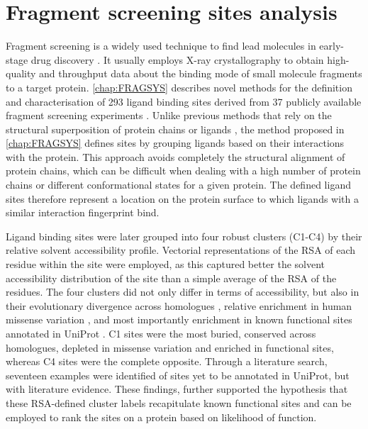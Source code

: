 \section{Fragment screening sites analysis}

Fragment screening is a widely used technique to find lead molecules in early-stage drug discovery \cite{MURRAY_2009_FBDD}. It usually employs X-ray crystallography to obtain high-quality and throughput data about the binding mode of small molecule fragments to a target protein. \autoref{chap:FRAGSYS} describes novel methods for the definition and characterisation of 293 ligand binding sites derived from 37 publicly available fragment screening experiments \cite{UTGES_2024_FRAGSYS}. Unlike previous methods that rely on the structural superposition of protein chains or ligands \cite{SHIN_2005_PDBLIGAND, KOZAKOV_2005_CLUSTERING, WASS_2010_3DLIGANDSITE}, the method proposed in \autoref{chap:FRAGSYS} defines sites by grouping ligands based on their interactions with the protein. This approach avoids completely the structural alignment of protein chains, which can be difficult when dealing with a high number of protein chains or different conformational states for a given protein. The defined ligand sites therefore represent a location on the protein surface to which ligands with a similar interaction fingerprint bind.

Ligand binding sites were later grouped into four robust clusters (C1-C4) by their relative solvent accessibility profile. Vectorial representations of the RSA \cite{TIEN_2013_RSA} of each residue within the site were employed, as this captured better the solvent accessibility distribution of the site than a simple average of the RSA of the residues. The four clusters did not only differ in terms of accessibility, but also in their evolutionary divergence across homologues \cite{UTGES_2021_ANKS}, relative enrichment in human missense variation \cite{MACGOWAN_2024_VARIANTS}, and most importantly enrichment in known functional sites annotated in UniProt \cite{UNIPROT_2018_UNIPROT}. C1 sites were the most buried, conserved across homologues, depleted in missense variation and enriched in functional sites, whereas C4 sites were the complete opposite. Through a literature search, seventeen examples were identified of sites yet to be annotated in UniProt, but with literature evidence. These findings, further supported the hypothesis that these RSA-defined cluster labels recapitulate known functional sites and can be employed to rank the sites on a protein based on likelihood of function.

